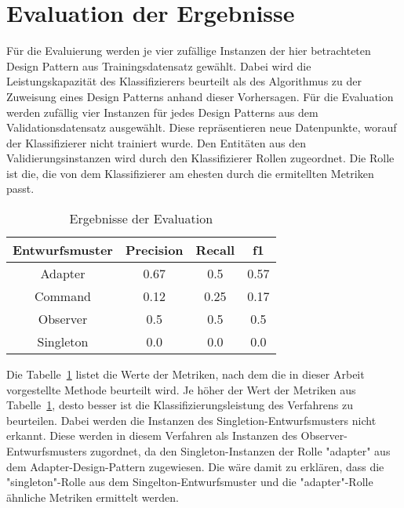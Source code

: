 \section{Evaluation der Ergebnisse}

Für die Evaluierung werden je vier zufällige Instanzen der hier betrachteten Design Pattern aus Trainingsdatensatz gewählt.
Dabei wird die Leistungskapazität des Klassifizierers beurteilt als des Algorithmus zu der Zuweisung eines Design Patterns anhand dieser Vorhersagen.
Für die Evaluation werden zufällig vier Instanzen für jedes Design Patterns aus dem Validationsdatensatz ausgewählt.
Diese repräsentieren neue Datenpunkte, worauf der Klassifizierer nicht trainiert wurde.
Den Entitäten aus den Validierungsinstanzen wird durch den Klassifizierer Rollen zugeordnet. Die Rolle ist die, die von dem Klassifizierer am ehesten durch die ermitellten Metriken passt.


\begin{table}[H]
    \centering
    \caption{Ergebnisse der Evaluation}
    \label{tab:evaluation}
    \begin{tabular}{|c|c|c|c|}
        \hline
        Entwurfsmuster & Precision & Recall & f1\\
        \hline
        Adapter & 0.67 & 0.5 & 0.57\\
        Command & 0.12 & 0.25 & 0.17\\
        Observer & 0.5 & 0.5 & 0.5\\
        Singleton & 0.0 & 0.0 & 0.0\\ 
        \hline
    \end{tabular}
\end{table}

Die Tabelle~\ref{tab:evaluation} listet die Werte der Metriken, nach dem die in dieser Arbeit vorgestellte Methode beurteilt wird.
Je höher der Wert der Metriken aus Tabelle~\ref{tab:evaluation}, desto besser ist die Klassifizierungsleistung des Verfahrens zu beurteilen.  
Dabei werden die Instanzen des Singletion-Entwurfsmusters nicht erkannt. Diese werden in diesem Verfahren als Instanzen des Observer-Entwurfsmusters zugordnet, da den Singleton-Instanzen der Rolle "adapter" aus dem Adapter-Design-Pattern zugewiesen.
Die wäre damit zu erklären, dass die "singleton"-Rolle aus dem Singelton-Entwurfsmuster und die "adapter"-Rolle ähnliche Metriken ermittelt werden.

